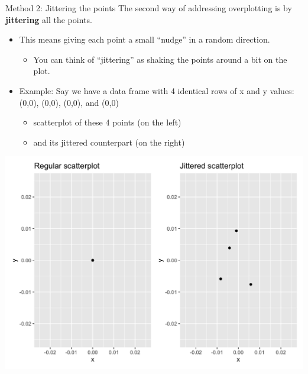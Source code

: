 \documentclass[
  ignorenonframetext,
]{beamer}
\providecommand{\tightlist}{%
  \setlength{\itemsep}{0pt}\setlength{\parskip}{0pt}}
\begin{document}
\begin{frame}{Method 2: Jittering the points}
\protect\hypertarget{method-2-jittering-the-points}{}
The second way of addressing overplotting is by \textbf{jittering} all
the points.

\begin{itemize}
\item
  This means giving each point a small ``nudge'' in a random direction.

  \begin{itemize}
  \tightlist
  \item
    You can think of ``jittering'' as shaking the points around a bit on
    the plot.
  \end{itemize}
\item
  Example: Say we have a data frame with 4 identical rows of x and y
  values: (0,0), (0,0), (0,0), and (0,0)

  \begin{itemize}
  \tightlist
  \item
    scatterplot of these 4 points (on the left)
  \item
    and its jittered counterpart (on the right)
  \end{itemize}
\end{itemize}

\tiny

\begin{center}\includegraphics[width=0.7\linewidth,height=0.3\textheight]{Week2_2} \end{center}
\normalsize
\end{frame}
\end{document}
